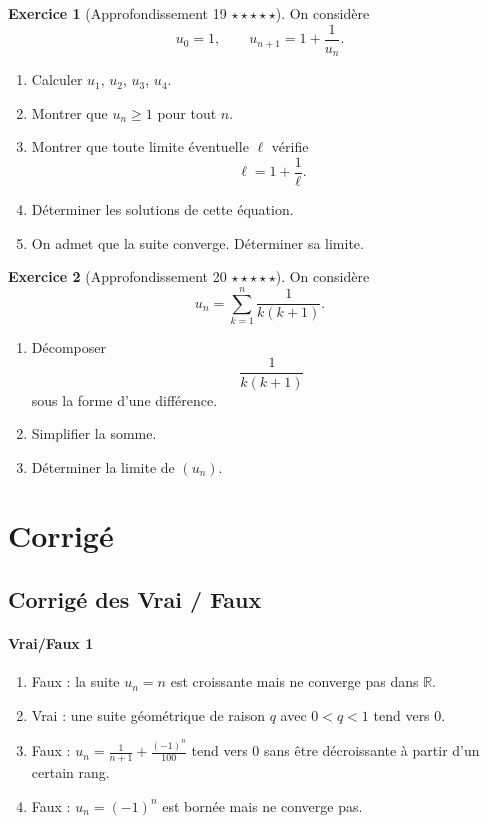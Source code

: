 \documentclass[11pt,a4paper]{article}
\theoremstyle{definition}
\newtheorem{exercice}{Exercice}[section]
\newcommand{\R}{\mathbb{R}}
\newcommand{\etoile}[1]{\hfill{\small\textbf{#1}}}
\begin{document}
\begin{exercice}[Approfondissement 19 \etoile{$\star\star\star\star\star$}]
On considère
\[
u_0=1,\qquad u_{n+1}=1+\frac1{u_n}.
\]
\begin{enumerate}[label=\arabic*.]
    \item Calculer $u_1$, $u_2$, $u_3$, $u_4$.
    \item Montrer que $u_n\ge1$ pour tout $n$.
    \item Montrer que toute limite éventuelle $\ell$ vérifie
    \[
    \ell=1+\frac1\ell.
    \]
    \item Déterminer les solutions de cette équation.
    \item On admet que la suite converge. Déterminer sa limite.
\end{enumerate}
\end{exercice}

\begin{exercice}[Approfondissement 20 \etoile{$\star\star\star\star\star$}]
On considère
\[
u_n=\sum_{k=1}^n \frac1{k(k+1)}.
\]
\begin{enumerate}[label=\arabic*.]
    \item Décomposer
    \[
    \frac1{k(k+1)}
    \]
    sous la forme d'une différence.
    \item Simplifier la somme.
    \item Déterminer la limite de $(u_n)$.
\end{enumerate}
\end{exercice}

\newpage
\section{Corrigé}

\subsection{Corrigé des Vrai / Faux}

\paragraph{Vrai/Faux 1}
\begin{enumerate}[label=\alph*)]
    \item Faux : la suite $u_n=n$ est croissante mais ne converge pas dans $\R$.
    \item Vrai : une suite géométrique de raison $q$ avec $0<q<1$ tend vers $0$.
    \item Faux : $u_n=\frac{1}{n+1}+\frac{(-1)^n}{100}$ tend vers $0$ sans être décroissante à partir d'un certain rang.
    \item Faux : $u_n=(-1)^n$ est bornée mais ne converge pas.
\end{enumerate}
\end{document}
